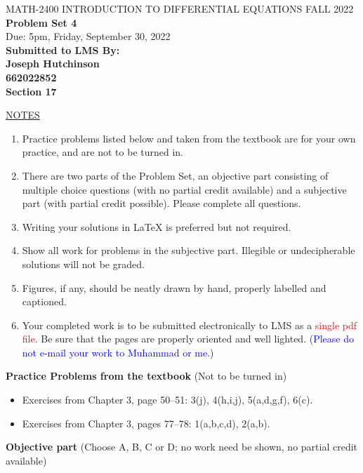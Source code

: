 \documentclass{article}
\begin{document}
\begin{center}
\large{ MATH-2400 \hspace{.27in}  INTRODUCTION TO DIFFERENTIAL EQUATIONS \hspace{.27in}FALL 2022\bigskip\\ {\bf Problem Set 4} \smallskip\\ Due: 5pm, Friday, September 30, 2022}\\
\textbf{Submitted to LMS By:\\ Joseph Hutchinson\\ 662022852 \\ Section 17 }
\end{center}

\bigskip\noindent
\underline{NOTES}
\begin{enumerate}
\item Practice problems listed below and taken from the textbook are for your own practice, and are not to be turned in.
\item There are two parts of the Problem Set, an objective part consisting of multiple choice questions (with no partial credit available) and a subjective part (with partial credit possible).  Please complete all questions.
\item Writing your solutions in {\LaTeX} is preferred but not required.
\item Show all work for problems in the subjective part.  Illegible or undecipherable solutions will not be graded. 
\item Figures, if any, should be neatly drawn by hand, properly labelled and captioned.  
\item Your completed work is to be submitted electronically to LMS  as a \textcolor{red}{single pdf file}. Be sure that the pages are properly oriented and well lighted.  (\textcolor{blue}{Please do not e-mail your work to Muhammad or me.})
\end{enumerate}

\bigskip\noindent
{\bf Practice Problems from the textbook} (Not to be turned in)
\begin{itemize}
\item
Exercises from Chapter 3, page 50--51: 3(j), 4(h,i,j), 5(a,d,g,f), 6(c).
\item
Exercises from Chapter 3, pages 77--78: 1(a,b,c,d), 2(a,b).
\end{itemize}

\bigskip\noindent
{\bf Objective part} (Choose A, B, C or D; no work need be shown, no partial credit available)
\end{document}
